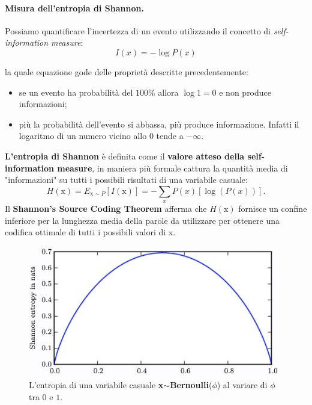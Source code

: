 \paragraph{Misura dell'entropia di Shannon.} Possiamo quantificare l'incertezza di un evento utilizzando il concetto di \textit{self-information measure}:
\begin{equation}
    I(x)=-\log P(x)
\end{equation}


la quale equazione gode delle proprietà descritte precedentemente:
\begin{itemize}
    \item se un evento ha probabilità del $100\%$ allora $\log 1=0$ e non produce informazioni;
    \item più la probabilità dell'evento si abbassa, più produce informazione. Infatti il logaritmo di un numero vicino allo $0$ tende a $-\infty$.
\end{itemize}
\textbf{L'entropia di Shannon} è definita come il \textbf{valore atteso della self-information measure}, in maniera più formale cattura la quantità media di "informazioni" su tutti i possibili risultati di una variabile casuale:
\begin{equation}
    H(\text{x})=E_{\text{x}\sim P}[I(\text{x})]=-\sum_xP(x)[\log(P(x))].
\end{equation}
Il \textbf{Shannon's Source Coding Theorem} afferma che $H(\text{x})$ fornisce un confine inferiore per la lunghezza media della parole da utilizzare per ottenere una codifica ottimale di tutti i possibili valori di x.
\begin{figure}[!h]
    \includegraphics[scale=.5]{images/prerequisites/shannon.png}
    \caption{L'entropia di una variabile casuale \textbf{x}$\sim$\textbf{Bernoulli}($\phi$) al variare di $\phi$ tra $0$ e $1$.}
    \centering
\end{figure}



